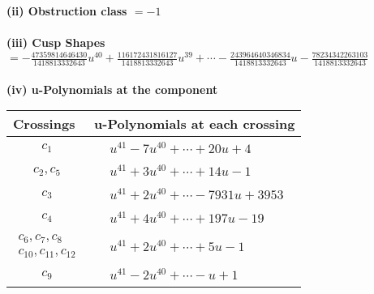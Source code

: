 \documentclass[1p]{elsarticle_modified}
\theoremstyle{definition}
\begin{document}
\flushleft \textbf{(ii) Obstruction class $= -1$}\\~\\
\flushleft \textbf{(iii) Cusp Shapes $= -\frac{47359814646430}{1418813332643} u^{40}+\frac{116172431816127}{1418813332643} u^{39}+\cdots-\frac{243964640346834}{1418813332643} u-\frac{78234342263103}{1418813332643}$}\\~\\
\newpage\renewcommand{\arraystretch}{1}
\flushleft \textbf{(iv) u-Polynomials at the component}\newline \\
\begin{tabular}{m{50pt}|m{274pt}}
Crossings & \hspace{64pt}u-Polynomials at each crossing \\
\hline $$\begin{aligned}c_{1}\end{aligned}$$&$\begin{aligned}
&u^{41}-7 u^{40}+\cdots+20 u+4
\end{aligned}$\\
\hline $$\begin{aligned}c_{2},c_{5}\end{aligned}$$&$\begin{aligned}
&u^{41}+3 u^{40}+\cdots+14 u-1
\end{aligned}$\\
\hline $$\begin{aligned}c_{3}\end{aligned}$$&$\begin{aligned}
&u^{41}+2 u^{40}+\cdots-7931 u+3953
\end{aligned}$\\
\hline $$\begin{aligned}c_{4}\end{aligned}$$&$\begin{aligned}
&u^{41}+4 u^{40}+\cdots+197 u-19
\end{aligned}$\\
\hline $$\begin{aligned}c_{6},c_{7},c_{8}\\c_{10},c_{11},c_{12}\end{aligned}$$&$\begin{aligned}
&u^{41}+2 u^{40}+\cdots+5 u-1
\end{aligned}$\\
\hline $$\begin{aligned}c_{9}\end{aligned}$$&$\begin{aligned}
&u^{41}-2 u^{40}+\cdots- u+1
\end{aligned}$\\
\hline
\end{tabular}\\~\\
\end{document}
